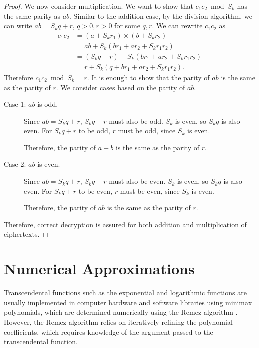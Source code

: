 \begin{proof}
	We now consider multiplication. We want to show that $c_1c_2 \bmod S_k$ has the same parity as $ab$. Similar to the addition case, by the division algorithm, we can write $ab = S_kq + r$, $q > 0, r > 0$ for some $q,r$. We can rewrite $c_1c_2$ as
	\begin{align*}
		c_1c_2 &= (a + S_kr_1) \times (b + S_kr_2)\\
		&= ab + S_k(br_1 + ar_2 + S_kr_1r_2)\\
		&= (S_kq + r) + S_k(br_1 + ar_2 + S_kr_1r_2)\\
		&= r + S_k(q + br_1 + ar_2 + S_kr_1r_2).
	\end{align*}
	Therefore $c_1c_2 \bmod S_k = r$.
	It is enough to show that the parity of $ab$ is the same as the parity of $r$. We consider cases based on the parity of $ab$.
	\begin{description}
		\item[Case 1: $ab$ is odd.]
			Since $ab = S_kq + r$, $S_kq + r$ must also be odd.
			$S_k$ is even, so $S_kq$ is also even.
			For $S_kq + r$ to be odd, $r$ must be odd, since $S_k$ is even.

			Therefore, the parity of $a+b$ is the same as the parity of $r$.
		\item[Case 2: $ab$ is even.]
			Since $ab = S_kq + r$, $S_kq + r$ must also be even.
			$S_k$ is even, so $S_kq$ is also even. For $S_kq + r$ to be even, $r$ must be even, since $S_k$ is even.

			Therefore, the parity of $ab$ is the same as the parity of $r$.
	\end{description}
	Therefore, correct decryption is assured for both addition and multiplication of ciphertexts.
\end{proof}



\section{Numerical Approximations}
\newcommand*\diff{\mathop{}\!\mathrm{d}}

Transcendental functions such as the exponential and logarithmic functions are usually implemented in computer hardware and software libraries using minimax polynomials, which are determined numerically using the Remez algorithm \cite{harrison_computation_1999}.
However, the Remez algorithm relies on iteratively refining the polynomial coefficients, which requires knowledge of the argument passed to the transcendental function.

